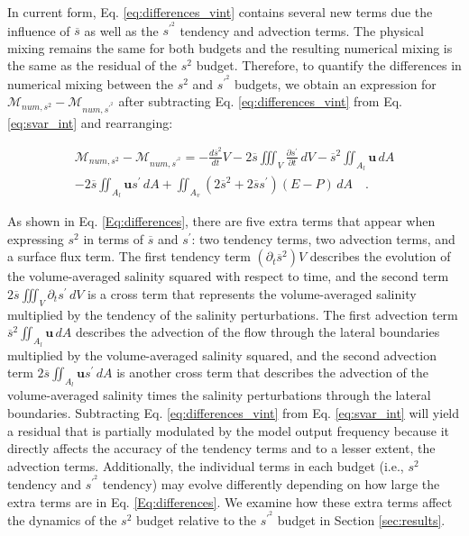 \documentclass[draft]{agujournal2019}
\begin{document}
In current form, Eq. \ref{eq:differences_vint} contains several new terms due the influence of $\overline{s}$ as well as the $s^{\prime^2}$ tendency and advection terms. The physical mixing remains the same for both budgets and the resulting numerical mixing is the same as the residual of the $s^2$ budget. Therefore, to quantify the differences in numerical mixing between the $s^2$ and $s^{\prime^2}$ budgets, we obtain an expression for $\mathcal{M}_{num, s^2}-\mathcal{M}_{num, s^{\prime^2}}$ after subtracting Eq. \ref{eq:differences_vint} from Eq. \ref{eq:svar_int} and rearranging:
\begin{linenomath*}
\begin{equation} \label{Eq:differences}
    \begin{split}
    \mathcal{M}_{num, s^2} - \mathcal{M}_{num, s^{\prime^2}}=-\frac{d \overline{s}^2}{d t} V   - 2\overline{s} \iiint_V \frac{\partial s^\prime}{\partial t} \, dV- \overline{s}^2 \iint_{A_l} \textbf{u} \, dA  \\ -2 \overline{s} \iint_{A_l} \textbf{u}s^{\prime} \, dA  + \iint_{A_v} (2\overline{s}^2+2 \overline{s} s^\prime)(E-P) \, dA \quad .
    \end{split}
\end{equation}
\end{linenomath*}
As shown in Eq. \ref{Eq:differences}, there are five extra terms that appear when expressing $s^2$ in terms of $\overline{s}$ and $s^{\prime}$: two tendency terms, two advection terms, and a surface flux term. The first tendency term $(\partial_t \overline{s}^2) V$ describes the evolution of the volume-averaged salinity squared with respect to time, and the second term $2\overline{s} \iiint_V \partial_t s^\prime \, dV$ is a cross term that represents the volume-averaged salinity multiplied by the tendency of the salinity perturbations. The first advection term $\overline{s}^2 \iint_{A_l} \mathbf{u} \, dA$ describes the advection of the flow through the lateral boundaries multiplied by the volume-averaged salinity squared, and the second advection term $2 \overline{s} \iint_{A_l} \textbf{u}s^{\prime} \, dA$ is another cross term that describes the advection of the volume-averaged salinity times the salinity perturbations through the lateral boundaries. Subtracting Eq. \ref{eq:differences_vint} from Eq. \ref{eq:svar_int} will yield a residual that is partially modulated by the model output frequency because it directly affects the accuracy of the tendency terms and to a lesser extent, the advection terms. Additionally, the individual terms in each budget (i.e., $s^2$ tendency and $s^{\prime^2}$ tendency) may evolve differently depending on how large the extra terms are in Eq. \ref{Eq:differences}. We examine how these extra terms affect the dynamics of the $s^2$ budget relative to the $s^{\prime^2}$ budget in Section \ref{sec:results}.
\end{document}
